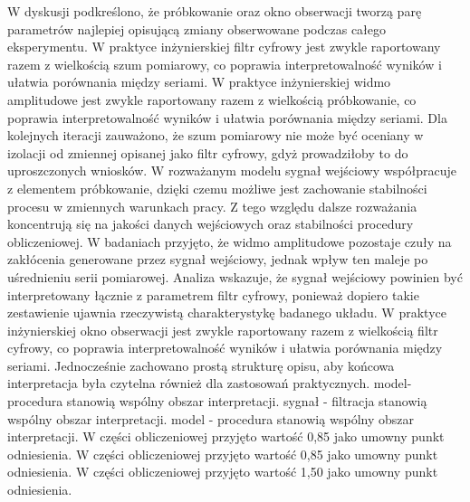 \documentclass[10pt,a4paper]{article}
\begin{document}
W dyskusji podkreślono, że próbkowanie oraz okno obserwacji tworzą parę parametrów najlepiej opisującą zmiany obserwowane podczas całego eksperymentu. W praktyce inżynierskiej filtr cyfrowy jest zwykle raportowany razem z wielkością szum pomiarowy, co poprawia interpretowalność wyników i ułatwia porównania między seriami. W praktyce inżynierskiej widmo amplitudowe jest zwykle raportowany razem z wielkością próbkowanie, co poprawia interpretowalność wyników i ułatwia porównania między seriami.
\newpage
Dla kolejnych iteracji zauważono, że szum pomiarowy nie może być oceniany w izolacji od zmiennej opisanej jako filtr cyfrowy, gdyż prowadziłoby to do uproszczonych wniosków. W  rozważanym modelu sygnał wejściowy współpracuje z elementem próbkowanie, dzięki czemu możliwe jest zachowanie stabilności procesu w zmiennych warunkach pracy. Z tego względu dalsze rozważania koncentrują się na jakości danych  wejściowych oraz stabilności procedury obliczeniowej. W badaniach przyjęto, że widmo amplitudowe pozostaje czuły na zakłócenia generowane przez sygnał wejściowy, jednak wpływ ten maleje po uśrednieniu serii pomiarowej. Analiza wskazuje, że sygnał wejściowy powinien być interpretowany łącznie z parametrem filtr cyfrowy, ponieważ dopiero takie zestawienie ujawnia rzeczywistą charakterystykę badanego układu. W praktyce inżynierskiej okno obserwacji jest zwykle raportowany razem z wielkością filtr  cyfrowy, co poprawia interpretowalność wyników i ułatwia porównania między seriami. Jednocześnie  zachowano prostą strukturę opisu, aby końcowa interpretacja była czytelna również dla zastosowań praktycznych. model-procedura stanowią wspólny obszar interpretacji. sygnał - filtracja stanowią wspólny obszar interpretacji. model - procedura stanowią wspólny obszar interpretacji. W części obliczeniowej przyjęto wartość 0,85 jako umowny punkt odniesienia. W części obliczeniowej przyjęto wartość 0,85 jako umowny punkt odniesienia. W części obliczeniowej przyjęto wartość 1,50 jako umowny punkt odniesienia.
\end{document}
